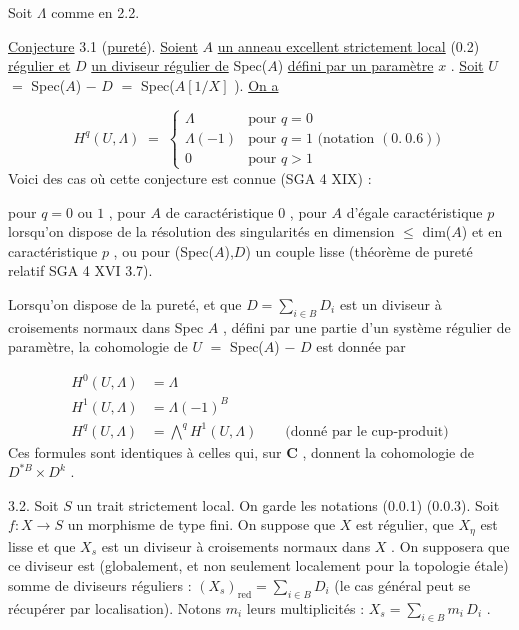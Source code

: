 Soit  $\Lambda$  comme en 2.2.

\underline{Conjecture} 3.1 (\underline{pureté}). \underline{Soient} $A$ \underline{un anneau excellent strictement local} (0.2) \underline{régulier et} $D$ \underline{un diviseur régulier de} Spec($A$) \underline{défini par un paramètre} $x$ . \underline{Soit} $U$ $=$ Spec($A$) $-$ $D$ $=$ Spec($A\left[1/X\right]$ ). \underline{On a}

\begin{equation}\tag{3.1.1}
H^{q}(U,\Lambda) \;=\; \left\{\begin{array}{ll} \Lambda & \text{pour } q = 0 \\[4pt] \Lambda(-1) & \text{pour } q = 1 \text{ (notation } (0.\ 0.6)) \\[4pt] 0 & \text{pour } q > 1 \end{array}\right.
\end{equation}
Voici des cas où cette conjecture est connue (SGA 4 XIX) :

pour  $q = 0$ ou $1$ , pour  $A$  de caractéristique  $0$ , pour  $A$  d'égale caractéristique  $p$  lorsqu'on dispose de la résolution des singularités en dimension $\leqslant$ dim($A$)  et en caractéristique  $p$ , ou pour  (Spec($A$),$D$)  un couple lisse (théorème de pureté relatif  SGA 4 XVI 3.7).

Lorsqu'on dispose de la pureté, et que  $D = \sum\limits_{i \in B} D_{i}$  est un diviseur à croisements normaux dans  Spec $A$ , défini par une partie d'un système régulier de paramètre, la cohomologie de  $U$ $=$ Spec($A$) $-$ $D$  est donnée par



\begin{equation}\tag{3.1.2}
\begin{aligned} H^{0}(U,\Lambda) &= \Lambda \\[4pt] H^{1}(U,\Lambda) &= \Lambda(-1)^{B} \\[4pt] H^{q}(U,\Lambda) &= \overset{q}{\bigwedge} H^{1}(U,\Lambda) \qquad \text{(donné par le cup-produit)} \end{aligned}
\end{equation}
Ces formules sont identiques à celles qui, sur  $\mathbf{C}$ , donnent la cohomologie de $D^{*B} \times D^{k}$ .

3.2. Soit  $S$  un trait strictement local. On garde les notations (0.0.1) (0.0.3). Soit  $f : X \longrightarrow S$  un morphisme de type fini. On suppose que  $X$  est régulier, que  $X_{\eta}$  est lisse et que  $X_{s}$  est un diviseur à croisements normaux dans  $X$ . On supposera que ce diviseur est (globalement, et non seulement localement pour la topologie étale) somme de diviseurs réguliers : $(X_{s})_{\mathrm{red}} = \sum\limits_{i \in B} D_{i}$  (le cas général peut se récupérer par localisation). Notons  $m_{i}$  leurs multiplicités : $X_{s} = \sum\limits_{i \in B} m_{i}\, D_{i}$ .

